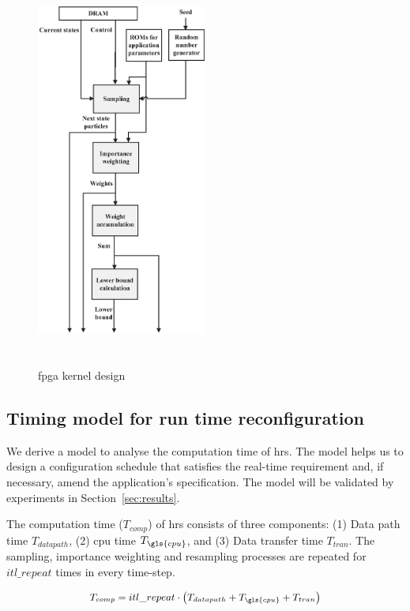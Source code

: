 \begin{figure}[t!]
\centering
\includegraphics[width=0.5\textwidth,height=130mm]{runtime_reconfiguration/figures/fig_kernel}
\caption{\gls{fpga} kernel design}
\label{fig:kernel}
\end{figure}

\subsection{Timing model for run time reconfiguration}
\label{sec:reconfig}

We derive a model to analyse the computation time of \gls{hrs}.
The model helps us to design a configuration schedule that satisfies the real-time requirement and, if necessary, amend the application's specification.
The model will be validated by experiments in Section~\ref{sec:results}.

The computation time ($T_{comp}$) of \gls{hrs} consists of three components: (1) Data path time $T_{datapath}$, (2) \gls{cpu} time $T_{\gls{cpu}}$, and (3) Data transfer time $T_{tran}$.
The sampling, importance weighting and resampling processes are repeated for $itl\_repeat$ times in every time-step.

\begin{equation}
\small
\begin{aligned}
T_{comp} = itl\_repeat \cdot \left ( T_{datapath} + T_{\gls{cpu}} + T_{tran} \right )
\end{aligned}
\label{eqt:total}
\end{equation}

